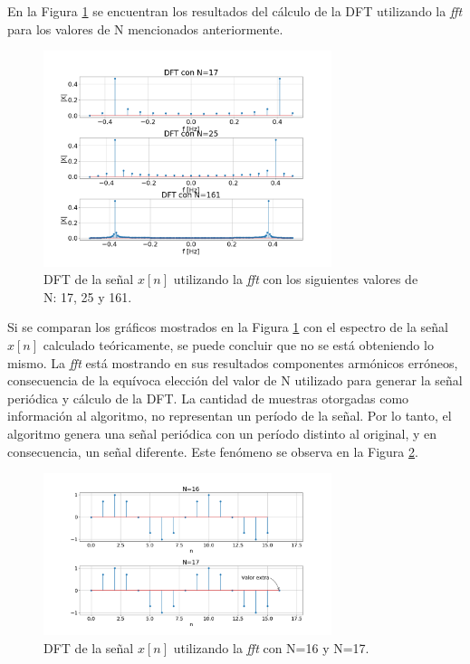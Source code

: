 \documentclass{article}
\begin{document}
En la Figura \ref{fig.1e} se encuentran los resultados del cálculo de la DFT utilizando la \textit{fft} para los valores de N mencionados anteriormente.

\begin{figure}[H]
\centering
\includegraphics[width=0.75\textwidth]{Img/punto_1_e.png}
\caption{DFT de la señal $x[n]$ utilizando la \textit{fft} con los siguientes valores de N: 17, 25 y 161.}
\label{fig.1e}
\end{figure}

Si se comparan los gráficos mostrados en la Figura \ref{fig.1e} con el espectro de la señal $x[n]$ calculado teóricamente, se puede concluir que no se está obteniendo lo mismo. La \textit{fft} está mostrando en sus resultados componentes armónicos erróneos, consecuencia de la equívoca elección del valor de N utilizado para generar la señal periódica y cálculo de la DFT. La cantidad de muestras otorgadas como información al algoritmo, no representan un período de la señal. Por lo tanto, el algoritmo genera una señal periódica con un período distinto al original, y en consecuencia, un señal diferente.  Este fenómeno se observa en la Figura \ref{fig.2e}.

\begin{figure}[H]
\centering
\includegraphics[width=0.75\textwidth]{Img/punto_1_dato_de_mas.png}
\caption{DFT de la señal $x[n]$ utilizando la \textit{fft} con N=16 y N=17.}
\label{fig.2e}
\end{figure}
\end{document}
